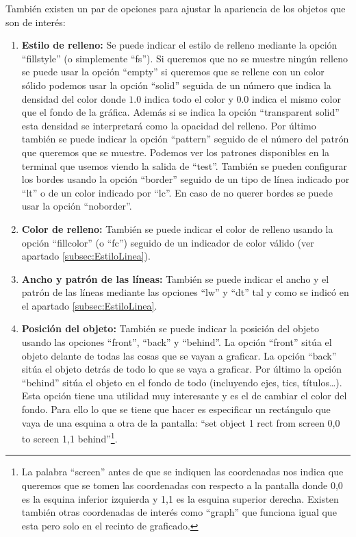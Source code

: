 \documentclass[11pt,a4paper,twoside,pdf]{article}
\numberwithin{equation}{section}
\begin{document}
También existen un par de opciones para ajustar la apariencia de los objetos que son de interés:

\begin{enumerate}
	\item \textbf{Estilo de relleno:} Se puede indicar el estilo de relleno mediante la opción ``fillstyle'' (o simplemente ``fs''). Si queremos que no se muestre ningún relleno se puede usar la opción ``empty'' si queremos que se rellene con un color sólido podemos usar la opción ``solid'' seguida de un número que indica la densidad del color donde $1.0$ indica todo el color y $0.0$ indica el mismo color que el fondo de la gráfica. Además si se indica la opción ``transparent solid'' esta densidad se interpretará como la opacidad del relleno. Por último también se puede indicar la opción ``pattern'' seguido de el número del patrón que queremos que se muestre. Podemos ver los patrones disponibles en la terminal que usemos viendo la salida de ``test''. También se pueden configurar los bordes usando la opción ``border'' seguido de un tipo de línea indicado por ``lt'' o de un color indicado por ``lc''. En caso de no querer bordes se puede usar la opción ``noborder''.
	\item \textbf{Color de relleno:} También se puede indicar el color de relleno usando la opción ``fillcolor'' (o ``fc'') seguido de un indicador de color válido (ver apartado \ref{subsec:EstiloLinea}).
	\item \textbf{Ancho y patrón de las líneas:} También se puede indicar el ancho y el patrón de las líneas mediante las opciones ``lw'' y ``dt'' tal y como se indicó en el apartado \ref{subsec:EstiloLinea}.
	\item \textbf{Posición del objeto:} También se puede indicar la posición del objeto usando las opciones ``front'', ``back'' y ``behind''. La opción ``front'' sitúa el objeto delante de todas las cosas que se vayan a graficar. La opción ``back'' sitúa el objeto detrás de todo lo que se vaya a graficar. Por último la opción ``behind'' sitúa el objeto en el fondo de todo (incluyendo ejes, tics, títulos\ldots). Esta opción tiene una utilidad muy interesante y es el de cambiar el color del fondo. Para ello lo que se tiene que hacer es especificar un rectángulo que vaya de una esquina a otra de la pantalla: ``set object 1 rect from screen 0,0 to screen 1,1 behind''\footnote{La palabra ``screen'' antes de que se indiquen las coordenadas nos indica que queremos que se tomen las coordenadas con respecto a la pantalla donde 0,0 es la esquina inferior izquierda y 1,1 es la esquina superior derecha. Existen también otras coordenadas de interés como ``graph'' que funciona igual que esta pero solo en el recinto de graficado.}.
\end{enumerate}
\end{document}
